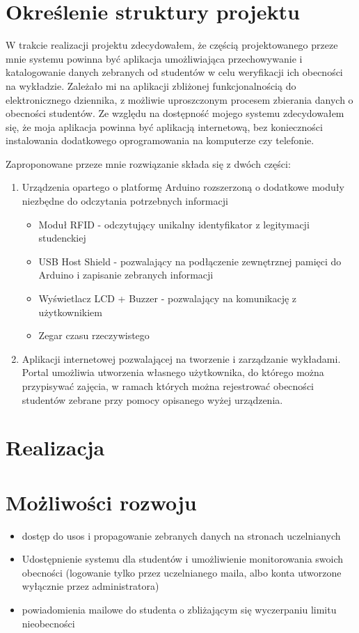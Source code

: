 \documentclass[declaration,shortabstract, mgr]{iithesis}
\begin{document}
\chapter{Określenie struktury projektu}
\indent W trakcie realizacji projektu zdecydowałem, że częścią projektowanego przeze mnie systemu powinna być aplikacja umożliwiająca przechowywanie i katalogowanie danych zebranych od studentów w celu weryfikacji ich obecności na wykładzie. Zależało mi na aplikacji zbliżonej funkcjonalnością do elektronicznego dziennika, z możliwie uproszczonym procesem zbierania danych o obecności studentów. Ze względu na dostępność mojego systemu zdecydowałem się, że moja aplikacja powinna być aplikacją internetową, bez konieczności instalowania dodatkowego oprogramowania na komputerze czy telefonie.

\indent Zaproponowane przeze mnie rozwiązanie składa się z dwóch części:
\begin{enumerate}
\item Urządzenia opartego o platformę Arduino rozszerzoną o dodatkowe moduły niezbędne do odczytania potrzebnych informacji
\begin{itemize}
\item Moduł RFID - odczytujący unikalny identyfikator z legitymacji studenckiej
\item USB Host Shield - pozwalający na podłączenie zewnętrznej pamięci do Arduino i zapisanie zebranych informacji
\item Wyświetlacz LCD + Buzzer - pozwalający na komunikację z użytkownikiem
\item Zegar czasu rzeczywistego
\end{itemize}
\item Aplikacji internetowej pozwalającej na tworzenie i zarządzanie wykładami. Portal umożliwia utworzenia własnego użytkownika, do którego można przypisywać zajęcia, w ramach których można rejestrować obecności studentów
zebrane przy pomocy opisanego wyżej urządzenia.
\end{enumerate}

\chapter{Realizacja}
\chapter{Możliwości rozwoju}
\begin{itemize}
\item dostęp do usos i propagowanie zebranych danych na stronach uczelnianych
\item Udostępnienie systemu dla studentów i umożliwienie monitorowania swoich obecności (logowanie tylko przez uczelnianego maila, albo konta utworzone wyłącznie przez administratora)
\item powiadomienia mailowe do studenta o zbliżającym się wyczerpaniu limitu nieobecności
\end{itemize}
\end{document}
